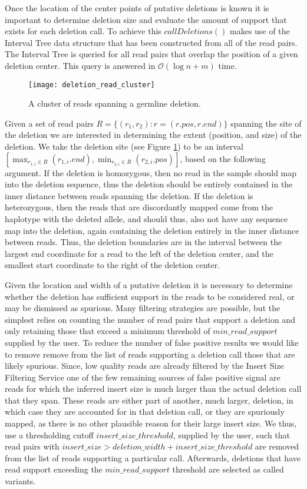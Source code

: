Once the location of the center points of putative deletions is known it is important to determine deletion size and evaluate the amount of support that exists for each deletion call. To achieve this $callDeletions()$ makes use of the Interval Tree data structure that has been constructed from all of the read pairs. The Interval Tree is queried for all read pairs that overlap the position of a given deletion center. This query is answered in $\mathcal{O}(\log{}n + m)$ time. 

\begin{figure}[H]
    \texttt{[image: deletion\_read\_cluster]}
    \centering
    \caption {A cluster of reads spanning a germline deletion.}
    \label{fig:deletion_read_cluster}
\end{figure}

Given a set of read pairs $R = \{(r_1,r_2) : r=(r.pos, r.end)\}$ spanning the site of the deletion we are interested in determining the extent (position, and size) of the deletion. We take the deletion site (see Figure \ref{fig:deletion_read_cluster}) to be an interval $[\max_{r_{1,i} \in R}{(r_{1,i}.end)}, \min_{r_{2,i} \in R}{(r_{2,i}.pos)}]$, based on the following argument. If the deletion is homozygous, then no read in the sample should map into the deletion sequence, thus the deletion should be entirely contained in the inner distance between reads spanning the deletion. If the deletion is heterozygous, then the reads that are discordantly mapped come from the haplotype with the deleted allele, and should thus, also not have any sequence map into the deletion, again containing the deletion entirely in the inner distance between reads. Thus, the deletion boundaries are in the interval between the largest end coordinate for a read to the left of the deletion center, and the smallest start coordinate to the right of the deletion center.

Given the location and width of a putative deletion it is necessary to determine whether the deletion has sufficient support in the reads to be considered real, or may be dismissed as spurious. Many filtering strategies are possible, but the simplest relies on counting the number of read pairs that support a deletion and only retaining those that exceed a minimum threshold of $min\_read\_support$ supplied by the user. To reduce the number of false positive results we would like to remove remove from the list of reads supporting a deletion call those that are likely spurious. Since, low quality reads are already filtered by the Insert Size Filtering Service one of the few remaining sources of false positive signal are reads for which the inferred insert size is much larger than the actual deletion call that they span. These reads are either part of another, much larger, deletion, in which case they are accounted for in that deletion call, or they are spuriously mapped, as there is no other plausible reason for their large insert size. We thus, use a thresholding cutoff $insert\_size\_threshold$, supplied by the user, such that read pairs with $insert\_size > deletion\_width + insert\_size\_threshold$ are removed from the list of reads supporting a particular call. Afterwards, deletions that have read support exceeding the $min\_read\_support$ threshold are selected as called variants. 

